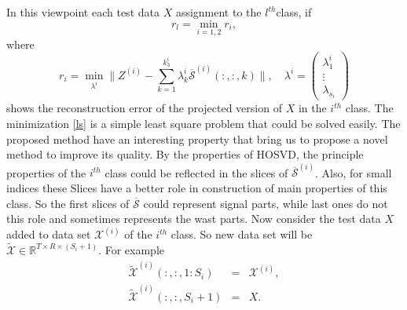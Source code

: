 \documentclass[preprint,12pt]{elsarticle}
\begin{document}
In this viewpoint each test data
$X$ assignment to the $l^{th}$class, if
\[
r_{l}=\min_{i=1,2} {r_{i}},
\]
where
\begin{equation}
\label{ls}
r_{i}=\min_{{\lambda^{i}}} \|Z^{(i)} -\sum_{k=1}^{k_3^i} \lambda_k^i \overline{\mathcal{S}}^{(i)}(:,:,k)\|,\quad
\lambda^i=\begin{pmatrix}
\lambda_1^i\\
\vdots\\
\lambda_{s_i}
\end{pmatrix}
\end{equation}
shows the  reconstruction error of the projected version of $X$ in the $i^{th}$ class.
The minimization  \eqref{ls} is a simple least square problem that could be solved easily.
The proposed method have an interesting property that  bring us to propose a novel method to improve its 
quality.
By the properties of HOSVD, the principle properties of the $i^{th}$ class could be reflected in the  slices of
$\overline{\mathcal{S}}^{(i)}$. Also, for small indices these Slices have a  better   role in construction of main properties of this class. So the first slices of $\overline{\mathcal{S}}$
could represent signal parts, while last ones do not this role and sometimes represents the wast parts.
Now consider the test data $X$ added to data set $\mathcal{X}^{(i)}$ of the $i^{th}$ class. So new data set will be
$\mathcal{\widetilde{X}}\in \mathbb{R}^{T\times R \times (S_{i}+1)}$. For example
\begin{eqnarray*}
	\widetilde{\mathcal{X}}^{(i)}(:,:,1:S_i)&=&{\mathcal{X}}^{(i)},\\
	\widetilde{\mathcal{X}}^{(i)}(:,:,S_i+1)&=&X.
\end{eqnarray*}
\end{document}

